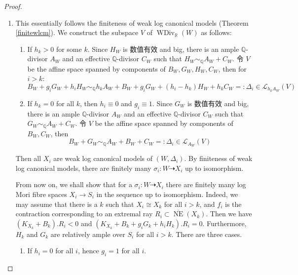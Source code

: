 \begin{proof}
  \begin{enumerate}
    \item This essentially follows the finiteness of weak log canonical models (Theorem \ref{finitewlcm}). We construct the subspace $V$ of $\operatorname{WDiv}_{\mathbb{R}}(W)$ as follows:
      \begin{enumerate}
        \item If $h_{k}>0$ for some $k$. Since $H_{W}$ is 数值有效 and big,  there is an  ample $\mathbb{Q}$-divisor $A_{W}$ and an effective $\mathbb{Q}$-divisor $C_{W}$  such that $H_{W}\sim_{\mathbb{Q}}A_{W}+C_{W}$. 令 $V$ be the affine space spanned by components of  $B_{W},G_{W},H_{W},C_{W}$, then for $i>k$:
              \[
                  B_{W}+g_{i}G_{W}+h_{i}H_{W}\sim_{\mathbb{Q}} h_{k}A_{W}+B_{W}+g_{i}G_{W}+(h_{i}-h_{k})H_{W}+h_{k}C_{W}=:\Delta_{i} \in \mathcal{L}_{h_{k}A_{W}}(V)
              \]
        \item If $h_{k}=0$ for all $k$, then $h_{i}\equiv 0$ and $g_{i}\equiv 1$.  Since $G_{W}$ is 数值有效 and big,  there is  an  ample $\mathbb{Q}$-divisor $A_{W}$ and an effective $\mathbb{Q}$-divisor $C_{W}$  such that $G_{W}\sim_{\mathbb{Q}}A_{W}+C_{W}$. 令 $V$ be the affine space spanned by components of  $B_{W},C_{W}$, then
              \[
                  B_{W}+G_{W}\sim_{\mathbb{Q}} A_{W}+B_{W}+C_{W}=:\Delta_{i} \in \mathcal{L}_{A_{W}}(V)
              \]
      \end{enumerate}
          Then all $X_{i}$ are weak log canonical models of $(W,\Delta_{i})$. By finiteness of weak log canonical models, there are finitely many $\sigma_{i}: W\dashrightarrow X_{i}$ up to isomorphism.

          From now on, we shall show that for a $\sigma_{i}: W\dashrightarrow X_{i}$ there are finitely many log Mori fibre spaces $X_i\to S_i$ in the sequence up to isomorphism.
          Indeed, we may assume that there is a $k$ such that $X_{i} \cong X_{k}$ for all $i>k$, and  $f_{i}$ is the contraction corresponding to an extremal ray $R_{i} \subset \overline{\operatorname{NE}}(X_{k}) $. Then we have $(K_{X_{k}}+B_{k}).R_{i}<0  $ and $(K_{X_{k}}+B_{k}+g_{i}G_{k}+h_{i}H_{k}).R_{i}=0$. Furthermore, $H_{k}$ and $G_{k}$ are relatively ample over $S_{i}$ for all $i>k$. There are three cases.

          \begin{enumerate}
            \item If $h_{i}=0$ for all $i$, hence $g_{i}=1$ for all $i$.


\end{enumerate}
\end{enumerate}
\end{proof}
